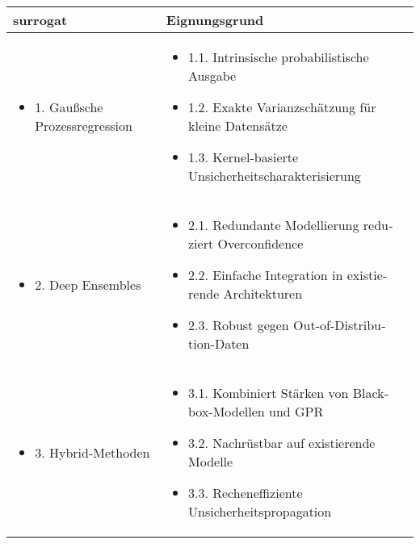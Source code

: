 \begin{otherlanguage}{ngerman}
\begin{table}[!htpb]
  \centering
  \footnotesize
  \begin{tabularx}{\textwidth}{|l|X|}
    \hline
    \textbf{\gls{surrogat}} & \textbf{Eignungsgrund} \\
    \hline
    \begin{itemize}[topsep=0em, itemsep=0.25em, left=0em, labelsep=0.25em]
      \item 1. \gls{Gaußsche Prozessregression}
    \end{itemize} &  
    \begin{itemize}[topsep=0em, itemsep=0em, left=0em, labelsep=0.25em]
      \item 1.1. Intrinsische probabilistische Ausgabe
      \item 1.2. Exakte Varianzschätzung für kleine Datensätze
      \item 1.3. Kernel-basierte Unsicherheitscharakterisierung
    \end{itemize} \\ 
    \hline
    \begin{itemize}[topsep=0em, itemsep=0em, left=0em, labelsep=0.25em]
      \item 2. Deep Ensembles
    \end{itemize} & 
    \begin{itemize}[topsep=0em, itemsep=0em, left=0em, labelsep=0.25em]
      \item 2.1. Redundante Modellierung reduziert Overconfidence
      \item 2.2. Einfache Integration in existierende Architekturen
      \item 2.3. Robust gegen Out-of-Distribution-Daten
    \end{itemize} \\
    \hline
    \begin{itemize}[topsep=0em, itemsep=0em, left=0em, labelsep=0.25em]
      \item 3. Hybrid-Methoden
    \end{itemize} & 
    \begin{itemize}[topsep=0em, itemsep=0em, left=0em, labelsep=0.25em]
      \item 3.1. Kombiniert Stärken von Blackbox-Modellen und GPR
      \item 3.2. Nachrüstbar auf existierende Modelle
      \item 3.3. Recheneffiziente Unsicherheitspropagation
    \end{itemize} \\

\end{tabularx}
\end{table}
\end{otherlanguage}
